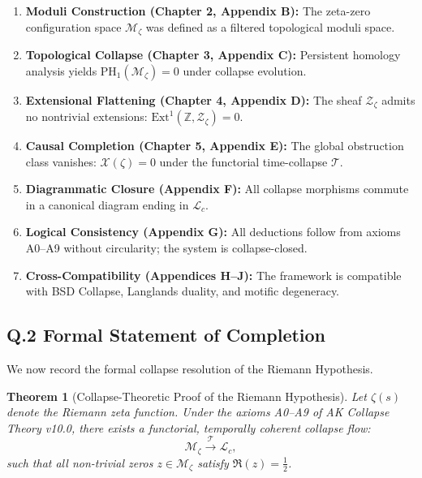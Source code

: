 \documentclass[11pt]{article}
\newtheorem{theorem}{Theorem}[section]
\newcommand{\Sha}{\mathcal{X}}
\begin{document}
\begin{enumerate}
    \item \textbf{Moduli Construction (Chapter 2, Appendix B):}  
    The zeta-zero configuration space $\mathcal{M}_\zeta$ was defined as a filtered topological moduli space.
    
    \item \textbf{Topological Collapse (Chapter 3, Appendix C):}  
    Persistent homology analysis yields $\mathrm{PH}_1(\mathcal{M}_\zeta) = 0$ under collapse evolution.

    \item \textbf{Extensional Flattening (Chapter 4, Appendix D):}  
    The sheaf $\mathcal{Z}_\zeta$ admits no nontrivial extensions: $\mathrm{Ext}^1(\mathbb{Z}, \mathcal{Z}_\zeta) = 0$.

    \item \textbf{Causal Completion (Chapter 5, Appendix E):}  
    The global obstruction class vanishes: $\Sha(\zeta) = 0$ under the functorial time-collapse $\mathcal{T}$.

    \item \textbf{Diagrammatic Closure (Appendix F):}  
    All collapse morphisms commute in a canonical diagram ending in $\mathcal{L}_c$.

    \item \textbf{Logical Consistency (Appendix G):}  
    All deductions follow from axioms A0–A9 without circularity; the system is collapse-closed.

    \item \textbf{Cross-Compatibility (Appendices H–J):}  
    The framework is compatible with BSD Collapse, Langlands duality, and motific degeneracy.
\end{enumerate}

\subsection*{Q.2 Formal Statement of Completion}

We now record the formal collapse resolution of the Riemann Hypothesis.

\begin{theorem}[Collapse-Theoretic Proof of the Riemann Hypothesis]
Let $\zeta(s)$ denote the Riemann zeta function. Under the axioms A0–A9 of AK Collapse Theory v10.0,  
there exists a functorial, temporally coherent collapse flow:
\[
\mathcal{M}_\zeta \xrightarrow{\mathcal{T}} \mathcal{L}_c,
\]
such that all non-trivial zeros $z \in \mathcal{M}_\zeta$ satisfy $\Re(z) = \tfrac{1}{2}$.
\end{theorem}
\end{document}
